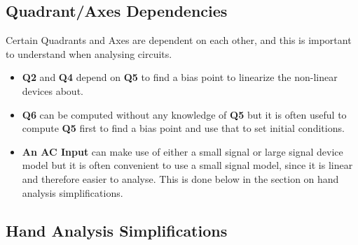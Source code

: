 \subsection{Quadrant/Axes Dependencies}

Certain Quadrants and Axes are dependent on each other, and this is important to
understand when analysing circuits.
\begin{itemize}
    \item \textbf{Q2} and \textbf{Q4} depend on \textbf{Q5} to find a bias
      point to linearize the non-linear devices about.
    \item \textbf{Q6} can be computed without any knowledge of \textbf{Q5}
      but it is often useful to compute \textbf{Q5} first to find a bias
      point and use that to set initial conditions.
    \item \textbf{An AC Input} can make use of either a small signal or
      large signal device model but it is often convenient to use a small
      signal model, since it is linear and therefore easier to analyse.
      This is done below in the section on hand analysis simplifications.
\end{itemize}

\subsection{Hand Analysis Simplifications}

